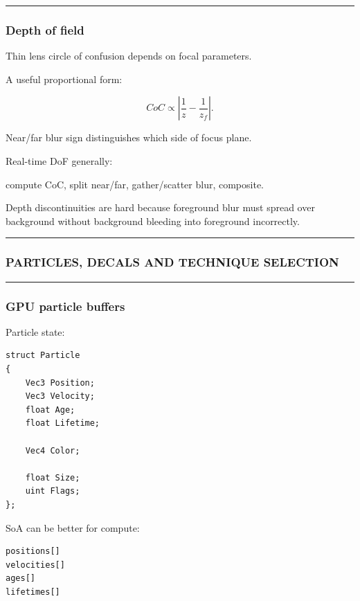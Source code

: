 \begin{center}\rule{0.5\linewidth}{0.5pt}\end{center}

\subsubsection{Depth of field}\label{depth-of-field}

Thin lens circle of confusion depends on focal parameters.

A useful proportional form:

\[
CoC
\propto
\left|
\frac1z-
\frac1{z_f}
\right|.
\]

Near/far blur sign distinguishes which side of focus plane.

Real-time DoF generally:

compute CoC, split near/far, gather/scatter blur, composite.

Depth discontinuities are hard because foreground blur must spread over background without background bleeding into foreground incorrectly.

\begin{center}\rule{0.5\linewidth}{0.5pt}\end{center}

\subsubsection{PARTICLES, DECALS AND TECHNIQUE SELECTION}\label{particles-decals-and-technique-selection}

\begin{center}\rule{0.5\linewidth}{0.5pt}\end{center}

\subsubsection{GPU particle buffers}\label{gpu-particle-buffers}

Particle state:

\begin{verbatim}
struct Particle
{
    Vec3 Position;
    Vec3 Velocity;
    float Age;
    float Lifetime;

    Vec4 Color;

    float Size;
    uint Flags;
};
\end{verbatim}

SoA can be better for compute:

\begin{verbatim}
positions[]
velocities[]
ages[]
lifetimes[]
\end{verbatim}

